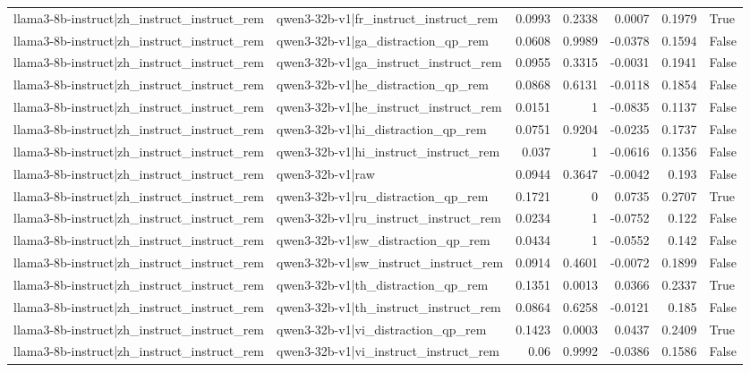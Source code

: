 \begin{table}
\begin{tabular}{l l r r r r l}
llama3-8b-instruct|zh_instruct_instruct_rem & qwen3-32b-v1|fr_instruct_instruct_rem & 0.0993 & 0.2338 & 0.0007 & 0.1979 & True \\
llama3-8b-instruct|zh_instruct_instruct_rem & qwen3-32b-v1|ga_distraction_qp_rem & 0.0608 & 0.9989 & -0.0378 & 0.1594 & False \\
llama3-8b-instruct|zh_instruct_instruct_rem & qwen3-32b-v1|ga_instruct_instruct_rem & 0.0955 & 0.3315 & -0.0031 & 0.1941 & False \\
llama3-8b-instruct|zh_instruct_instruct_rem & qwen3-32b-v1|he_distraction_qp_rem & 0.0868 & 0.6131 & -0.0118 & 0.1854 & False \\
llama3-8b-instruct|zh_instruct_instruct_rem & qwen3-32b-v1|he_instruct_instruct_rem & 0.0151 & 1 & -0.0835 & 0.1137 & False \\
llama3-8b-instruct|zh_instruct_instruct_rem & qwen3-32b-v1|hi_distraction_qp_rem & 0.0751 & 0.9204 & -0.0235 & 0.1737 & False \\
llama3-8b-instruct|zh_instruct_instruct_rem & qwen3-32b-v1|hi_instruct_instruct_rem & 0.037 & 1 & -0.0616 & 0.1356 & False \\
llama3-8b-instruct|zh_instruct_instruct_rem & qwen3-32b-v1|raw & 0.0944 & 0.3647 & -0.0042 & 0.193 & False \\
llama3-8b-instruct|zh_instruct_instruct_rem & qwen3-32b-v1|ru_distraction_qp_rem & 0.1721 & 0 & 0.0735 & 0.2707 & True \\
llama3-8b-instruct|zh_instruct_instruct_rem & qwen3-32b-v1|ru_instruct_instruct_rem & 0.0234 & 1 & -0.0752 & 0.122 & False \\
llama3-8b-instruct|zh_instruct_instruct_rem & qwen3-32b-v1|sw_distraction_qp_rem & 0.0434 & 1 & -0.0552 & 0.142 & False \\
llama3-8b-instruct|zh_instruct_instruct_rem & qwen3-32b-v1|sw_instruct_instruct_rem & 0.0914 & 0.4601 & -0.0072 & 0.1899 & False \\
llama3-8b-instruct|zh_instruct_instruct_rem & qwen3-32b-v1|th_distraction_qp_rem & 0.1351 & 0.0013 & 0.0366 & 0.2337 & True \\
llama3-8b-instruct|zh_instruct_instruct_rem & qwen3-32b-v1|th_instruct_instruct_rem & 0.0864 & 0.6258 & -0.0121 & 0.185 & False \\
llama3-8b-instruct|zh_instruct_instruct_rem & qwen3-32b-v1|vi_distraction_qp_rem & 0.1423 & 0.0003 & 0.0437 & 0.2409 & True \\
llama3-8b-instruct|zh_instruct_instruct_rem & qwen3-32b-v1|vi_instruct_instruct_rem & 0.06 & 0.9992 & -0.0386 & 0.1586 & False \\

\end{tabular}
\end{table}
